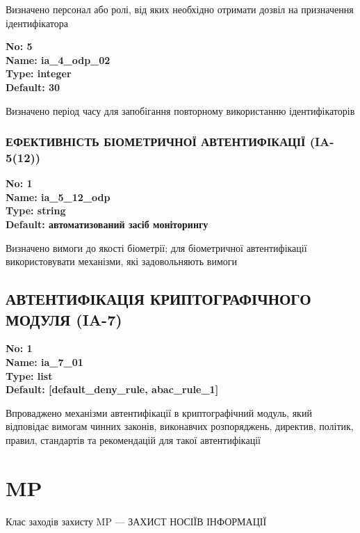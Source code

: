 \documentclass{article}
\begin{document}
{\footnotesize Визначено персонал або ролі, від яких необхідно отримати дозвіл на призначення ідентифікатора}


{\footnotesize\bfseries
No: 5\\
Name: ia\_\allowbreak{}4\_\allowbreak{}odp\_\allowbreak{}02\\
Type: integer\\
Default: 30
}

{\footnotesize Визначено період часу для запобігання повторному використанню ідентифікаторів}




\subsubsection{ЕФЕКТИВНІСТЬ БІОМЕТРИЧНОЇ АВТЕНТИФІКАЦІЇ (IA-5(12))}


\vspace{10pt}
{\footnotesize\bfseries
No: 1\\
Name: ia\_\allowbreak{}5\_\allowbreak{}12\_\allowbreak{}odp\\
Type: string\\
Default: \textquotedbl{}автоматизований засіб моніторингу\textquotedbl{}
}

{\footnotesize Визначено вимоги до якості біометрії; для біометричної автентифікації використовувати механізми, які задовольняють вимоги}




\subsection{АВТЕНТИФІКАЦІЯ КРИПТОГРАФІЧНОГО МОДУЛЯ (IA-7)}


\vspace{10pt}
{\footnotesize\bfseries
No: 1\\
Name: ia\_\allowbreak{}7\_\allowbreak{}01\\
Type: list\\
Default: [\textquotedbl{}default\_\allowbreak{}deny\_\allowbreak{}rule\textquotedbl{}, \textquotedbl{}abac\_\allowbreak{}rule\_\allowbreak{}1\textquotedbl{}]
}

{\footnotesize Впроваджено механізми автентифікації в криптографічний модуль, який відповідає вимогам чинних законів, виконавчих розпоряджень, директив, політик, правил, стандартів та рекомендацій для такої автентифікації}




\section{MP}
Клас заходів захисту MP --- ЗАХИСТ НОСІЇВ ІНФОРМАЦІЇ
\end{document}
